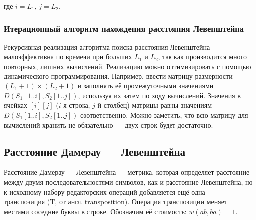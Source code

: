 где $i = L_1$, $j = L_2$.

\subsubsection{Итерационный алгоритм нахождения расстояния Левенштейна}

Рекурсивная реализация алгоритма поиска расстояния Левенштейна малоэффективна по времени при больших $L_1$ и $L_2$, так как производится много повторных, лишних вычислений.
Реализацию можно оптимизировать с помощью динамического программирования.
Например, ввести матрицу размерности $(L_1 + 1) \times (L_2 + 1)$ и заполнять её промежуточными значениями $D(S_1[1 .. i], S_2[1 .. j])$, используя их затем по ходу вычислений.
Значения в ячейках $[i][j]$ ($i$-я строка, $j$-й столбец) матрицы равны значениям $D(S_1[1 .. i], S_2[1 .. j])$ соответственно.
Можно заметить, что всю матрицу для вычислений хранить не обязательно --- двух строк будет достаточно.

\subsection{Расстояние Дамерау --- Левенштейна}

Расстояние Дамерау --- Левенштейна --- метрика, которая определяет расстояние между двумя последовательностями символов, как и расстояние Левенштейна, но к исходному набору редакторских операций добавляется ещё одна --- транспозиция (T, от англ. transposition).
Операция транспозиции меняет местами соседние буквы в строке.
Обозначим её стоимость: $w(ab, ba) = 1$.

